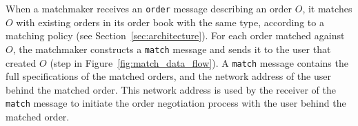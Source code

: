 When a matchmaker receives an \texttt{order} message describing an order $ O $, it matches $ O $ with existing orders in its order book with the same type, according to a matching policy (see Section~\ref{sec:architecture}).
For each order matched against $ O $, the matchmaker constructs a \texttt{match} message and sends it to the user that created $ O $ (step  in Figure~\ref{fig:match_data_flow}).
A \texttt{match} message contains the full specifications of the matched orders, and the network address of the user behind the matched order.
This network address is used by the receiver of the \texttt{match} message to initiate the order negotiation process with the user behind the matched order.







